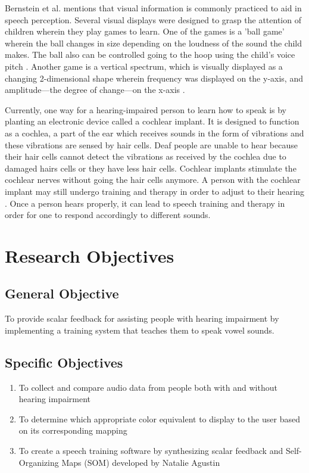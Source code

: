 Bernstein et al. \citeyear{bernstein:1988:STA} mentions that visual information is commonly practiced to aid in speech perception. Several visual displays were designed to grasp the attention of children wherein they play games to learn. One of the games is a 'ball game' wherein the ball changes in size depending on the loudness of the sound the child makes. The ball also can be controlled going to the hoop using the child's voice pitch \cite{bernstein:1988:STA}. Another game is a vertical spectrum, which is visually displayed as a changing 2-dimensional shape wherein frequency was displayed on the y-axis, and amplitude—the degree of change—on the x-axis \cite{bernstein:1988:STA}.

Currently, one way for a hearing-impaired person to learn how to speak is by planting an electronic device called a cochlear implant. It is designed to function as a cochlea, a part of the ear which receives sounds in the form of vibrations and these vibrations are sensed by hair cells. Deaf people are unable to hear because their hair cells cannot detect the vibrations as received by the cochlea due to damaged hairs cells or they have less hair cells. Cochlear implants stimulate the cochlear nerves without going the hair cells anymore. A person with the cochlear implant may still undergo training and therapy in order to adjust to their hearing \cite{blume:2009:AE}. Once a person hears properly, it can lead to speech training and therapy in order for one to respond accordingly to different sounds.

\section{Research Objectives}
\label{sec:researchobjectives}

\subsection{General Objective}
\label{sec:generalobjective}

To provide scalar feedback for assisting people with hearing impairment by implementing a training system that teaches them to speak vowel sounds.

\subsection{Specific Objectives}
\label{sec:specificobjectives}

\begin{enumerate}
\item To collect and compare audio data from people both with and without hearing impairment
\item To determine which appropriate color equivalent to display to the user based on its corresponding mapping
\item To create a speech training software by synthesizing scalar feedback and Self-Organizing Maps (SOM) developed by Natalie Agustin \citeyear{agustin:2014:SOM}
\end{enumerate}

